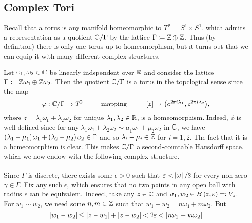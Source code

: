 \documentclass[../Moduli_Spaces_of_Riemann_Surfaces.tex]{subfiles}
\begin{document}
    \subsection{Complex Tori}
    Recall that a torus is any manifold homeomorphic to $T^2\coloneqq S^1\times S^1$, which admits a representation as a quotient $\mathbb{C}/\Gamma$ by the lattice $\Gamma\coloneqq\mathbb{Z}\oplus\mathbb{Z}$. Thus (by definition) there is only one torus up to homeomorphism, but it turns out that we can equip it with many different complex structures.
    \begin{example}\label{1.1:exa:tori}
        Let $\omega_1,\omega_2\in\mathbb{C}$ be linearly independent over $\mathbb{R}$ and consider the lattice $\Gamma\coloneqq\mathbb{Z}\omega_1\oplus\mathbb{Z}\omega_2$. Then the quotient $\mathbb{C}/\Gamma$ is a torus in the topological sense since the map
        \begin{equation*}
            \phi:\C/\Gamma\to T^2\ \ \ \ \ \ \ \ \textrm{mapping}\ \ \ \ \ \ \ \ \l[z\r]\mapsto\big(e^{2\pi i\lambda_1},e^{2\pi i\lambda_2}\big),
        \end{equation*}
        where $z=\lambda_1\omega_1+\lambda_2\omega_2$ for unique $\lambda_1,\lambda_2\in\mathbb{R}$, is a homeomorphism. Indeed, $\phi$ is well-defined since for any $\lambda_1\omega_1+\lambda_2\omega_2\sim\mu_1\omega_1+\mu_2\omega_2$ in $\mathbb{C}$, we have $\left(\lambda_1-\mu_1\right)\omega_1+\left(\lambda_2-\mu_2\right)\omega_2\in\Gamma$ and so $\lambda_i-\mu_i\in\mathbb{Z}$ for $i=1,2$. The fact that it is a homeomorphism is clear. This makes $\mathbb{C}/\Gamma$ a second-countable Hausdorff space, which we now endow with the following complex structure.\\\ \\
        Since $\Gamma$ is discrete, there exists some $\epsilon>0$ such that $\varepsilon<\left|\omega\right|/2$ for every non-zero $\gamma\in\Gamma$. Fix any such $\epsilon$, which ensures that no two points in any open ball with radius $\epsilon$ can be equivalent. Indeed, take any $z\in\mathbb{C}$ and $w_1,w_2\in B\left(z,\varepsilon\right)\eqqcolon V_z$. For $w_1\sim w_2$, we need some $n,m\in\mathbb{Z}$ such that $w_1-w_2=n\omega_1+m\omega_2$. But
        \begin{equation*}
            \l|w_1-w_2\r|\leq\l|z-w_1\r|+\l|z-w_2\r|<2\epsilon<\l|n\omega_1+m\omega_2\r|

\end{equation*}
\end{example}
\end{document}
